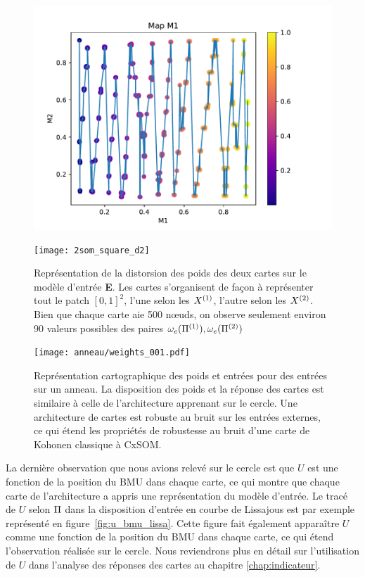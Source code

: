 \documentclass[../main]{subfiles}
\begin{document}
\begin{figure}[H]
	\hfill\begin{minipage}{0.4\textwidth}
		\includegraphics[width=\textwidth]{2som_square_d}
	\end{minipage}
	\begin{minipage}{0.4\textwidth}
		\texttt{[image: 2som\_square\_d2]}
	\end{minipage}\hfill
	\caption{Représentation de la distorsion des poids des deux cartes sur le modèle d'entrée \textbf{E}. Les cartes s'organisent de façon à représenter tout le patch $[0,1]^2$, l'une selon les $X^{({1})}$, l'autre selon les $X^{({2})}$. Bien que chaque carte aie 500 n\oe{}uds, on observe seulement environ 90 valeurs possibles des paires $\omega_e(\Pi^{({1})}),\omega_e(\Pi^{({2})})$ \label{fig:2som_p_d}}
\end{figure}

\begin{figure}[H]
	\centering\texttt{[image: anneau/weights\_001.pdf]}
	\caption{Représentation cartographique des poids et entrées pour des entrées sur un anneau. La disposition des poids et la réponse des cartes est similaire à celle de l'architecture apprenant sur le cercle. Une architecture de cartes est robuste au bruit sur les entrées externes, ce qui étend les propriétés de robustesse au bruit d'une carte de Kohonen classique à CxSOM. \label{fig:anneau_w}}
\end{figure}


La dernière observation que nous avions relevé sur le cercle est que $U$ est une fonction de la position du BMU dans chaque carte, ce qui montre que chaque carte de l'architecture a appris une représentation du modèle d'entrée. Le tracé de $U$ selon $\Pi$ dans la disposition d'entrée en courbe de Lissajous est par exemple représenté en figure~\ref{fig:u_bmu_lissa}. 
Cette figure fait également apparaître $U$ comme une fonction de la position du BMU dans chaque carte, ce qui étend l'observation réalisée sur le cercle.
Nous reviendrons plus en détail sur l'utilisation de $U$ dans l'analyse des réponses des cartes au chapitre \ref{chap:indicateur}.
\end{document}
